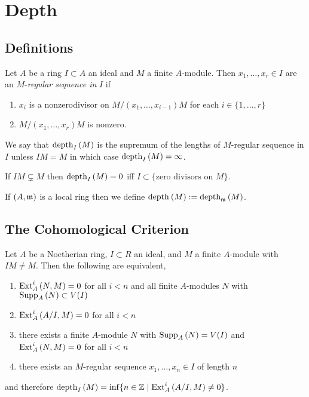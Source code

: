 \documentclass[12pt]{article}
\begin{document}
\section{Depth}

\subsection{Definitions}

\begin{defn}
Let $A$ be a ring $I \subset A$ an ideal and $M$ a finite $A$-module. Then $x_1, \dots, x_r \in I$ are an $M$-\textit{regular sequence in} $I$ if
\begin{enumerate}
\item $x_i$ is a nonzerodivisor on $M / (x_1, \dots, x_{i-1}) M$ for each $i \in \{1, \dots, r \}$
\item $M / (x_1, \dots, x_r)M$ is nonzero. 
\end{enumerate}
We say that $\mathrm{depth}_{I} \left( M \right)$ is the supremum of the lengths of $M$-regular sequence in $I$ unless $IM = M$ in which case $\mathrm{depth}_{I} \left( M \right) = \infty$.
\end{defn}

\begin{rmk}
If $IM \subsetneq M$ then $\mathrm{depth}_{I} \left( M \right) = 0$ iff $I \subset \{ \text{zero divisors on } M \}$.
\end{rmk}

\begin{rmk}
If $(A, \mathfrak{m})$ is a local ring then we define $\mathrm{depth}_{} \left( M \right) := \mathrm{depth}_{\mathfrak{m}} \left( M \right)$.
\end{rmk}

\subsection{The Cohomological Criterion}


\begin{lemma}
Let $A$ be a Noetherian ring, $I \subset R$ an ideal, and $M$ a finite $A$-module with $IM \neq M$. Then the following are equivalent,
\begin{enumerate}
\item $\mathrm{Ext}^{i}_{A} \left( N, M \right) = 0$ for all $i < n$ and all finite $A$-modules $N$ with $\mathrm{Supp}_{A}\left(N \right) \subset V(I)$

\item $\mathrm{Ext}^{i}_{A} \left( A/I, M \right) = 0$ for all $i < n$

\item there exists a finite $A$-module $N$ with $\mathrm{Supp}_{A}\left(N \right) = V(I)$ and $\mathrm{Ext}^{i}_{A} \left( N, M \right) = 0$ for all $i < n$

\item there exists an $M$-regular sequence $x_1, \dots, x_n \in I$ of length $n$
\end{enumerate}
and therefore $\mathrm{depth}_{I} \left( M \right) = \inf \{ n \in \mathbb{Z} \mid \mathrm{Ext}^{i}_{A} \left( A/I, M \right) \neq 0 \}$.
\end{lemma}
\end{document}
